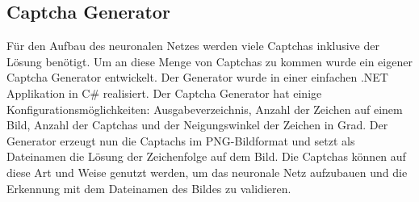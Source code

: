 \subsection{Captcha Generator}
Für den Aufbau des neuronalen Netzes werden viele Captchas inklusive der Lösung benötigt. Um an diese Menge von Captchas zu kommen wurde ein eigener Captcha Generator entwickelt. Der Generator wurde in einer einfachen .NET Applikation in C\# realisiert. Der Captcha Generator hat einige Konfigurationsmöglichkeiten: Ausgabeverzeichnis, Anzahl der Zeichen auf einem Bild, Anzahl der Captchas und der Neigungswinkel der Zeichen in Grad. Der Generator erzeugt nun die Captachs im PNG-Bildformat und setzt als Dateinamen die Lösung der Zeichenfolge auf dem Bild. Die Captchas können auf diese Art und Weise genutzt werden, um das neuronale Netz aufzubauen und die Erkennung mit dem Dateinamen des Bildes zu validieren.